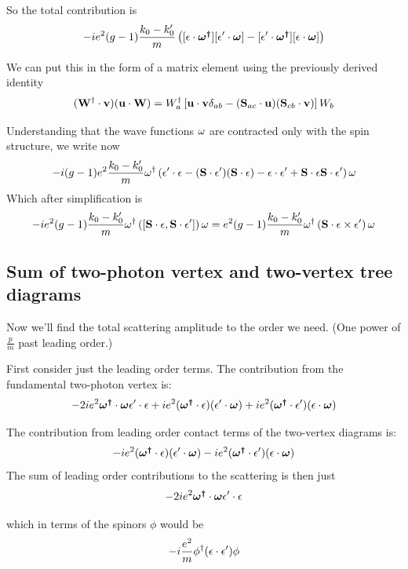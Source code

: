 So the total contribution is
\[
	-ie^2 (g-1) \frac{ k_0 - k'_0}{m} \left( [\mathbf{\epsilon} \cdot \mbox{\boldmath$ \omega^\dagger $}] [\mathbf{\epsilon'} \cdot \mbox{\boldmath$ \omega $} ] -  [\mathbf{\epsilon'} \cdot \mbox{\boldmath$ \omega^\dagger $}] [\mathbf{\epsilon} \cdot \mbox{\boldmath$ \omega $} ] \right )
\]




We can put this in the form of a matrix element using the previously derived identity
\[(\mathbf{W^\dagger} \cdot \mathbf{v} )( \mathbf{u} \cdot \mathbf{W} )= W^\dagger_a \left[ \mathbf{u} \cdot \mathbf{v} \delta_{ab} - (\mathbf{S}_{ac} \cdot \mathbf{u})(\mathbf{S}_{cb} \cdot \mathbf{v}) \right ] W_b\] 


Understanding that the wave functions $\omega$ are contracted only with the spin structure, we write now
\[
		  -i (g-1)e^2  \frac{ k_0 - k'_0}{m} \omega^\dagger \left( \mathbf{\epsilon'} \cdot \mathbf{\epsilon} - (\mathbf{S} \cdot \mathbf{\epsilon'}) (\mathbf{S} \cdot \mathbf{\epsilon})  -\mathbf{\epsilon} \cdot \mathbf{\epsilon'} + \mathbf{S} \cdot \mathbf{\epsilon} \mathbf{S} \cdot \mathbf{\epsilon'} \right ) \omega
\]
Which after simplification is
\[
	-i  e^2 (g-1) \frac{ k_0 - k'_0}{m} \omega^\dagger \left(  [\mathbf{S} \cdot \mathbf{\epsilon}, \mathbf{S} \cdot \mathbf{\epsilon'}] \right ) \omega
=
	e^2 (g-1) \frac{ k_0 - k'_0}{m} \omega^\dagger  \left( \mathbf{S} \cdot \mathbf{\epsilon} \times \mathbf{\epsilon'} \right ) \omega
\]



\subsection{Sum of two-photon vertex and two-vertex tree diagrams}
Now we'll find the total scattering amplitude to the order we need.  (One power of $\frac{p}{m}$ past leading order.) 

First consider just the leading order terms.  The contribution from the fundamental two-photon vertex is:
\[
-2 i e^2\mbox{\boldmath$ \omega^\dagger $} \cdot \mbox{\boldmath$ \omega $} \mathbf{\epsilon'} \cdot \mathbf{\epsilon}  
+ i e^2(\mbox{\boldmath$ \omega^\dagger $} \cdot  \mathbf{\epsilon}) (\mathbf{\epsilon'} \cdot \mbox{\boldmath$ \omega $})	
+ i e^2(\mbox{\boldmath$ \omega^\dagger $} \cdot  \mathbf{\epsilon'}) (\mathbf{\epsilon} \cdot \mbox{\boldmath$ \omega $})	
\]

The contribution from leading order contact terms of the two-vertex diagrams is:
\[
- i e^2 (\mbox{\boldmath$ \omega^\dagger $} \cdot \mathbf{\epsilon}) ( \mathbf{\epsilon'} \cdot \mbox{\boldmath$ \omega $}) - i e^2 (\mbox{\boldmath$ \omega^\dagger $} \cdot \mathbf{\epsilon'}) ( \mathbf{\epsilon} \cdot \mbox{\boldmath$ \omega $}) 
\]
The sum of leading order contributions to the scattering is then just 
\[
- 2 i e^2\mbox{\boldmath$ \omega^\dagger $} \cdot \mbox{\boldmath$ \omega $} \mathbf{\epsilon'} \cdot \mathbf{\epsilon}  
\]

which in terms of the spinors $\phi$ would be
\[
 - i\frac{e^2}{m} \phi^\dagger (\mathbf{\epsilon}\cdot \mathbf{\epsilon'} ) \phi
\]


